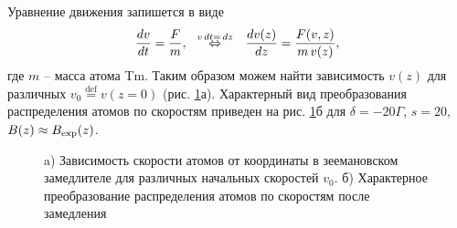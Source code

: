 Уравнение движения запишется в виде
\begin{equation}
    \frac{d v}{d t} = \frac{F}{m},
    \hspace{0.25cm} \overset{v \, d t = \, d z}{\Leftrightarrow}  \hspace{0.25cm}
    \frac{d v(z)}{d z} = \frac{F(v, z)}{m \, v(z)},
\end{equation}
где $m$ -- масса атома Tm. Таким образом можем найти зависимость $v(z)$ для различных $v_0 \overset{\mathrm{def}}{=} v(z=0)$ (рис. \ref{fig:vZz}а). Характерный вид преобразования распределения атомов по скоростям приведен на рис. \ref{fig:vZz}б для $\delta = -20\Gamma$, $s=20$, $B(z) \approx B_{\textnormal{exp}}(z)$.
\begin{figure}[ht]
    \centering
    \hspace{5 mm} 
    \vspace{-3mm}
    \caption{a) Зависимость скорости атомов от координаты в зеемановском замедлителе  для различных начальных скоростей $v_0$. б) Характерное преобразование распределения атомов по скоростям после замедления}
    \label{fig:vZz}
\end{figure}

